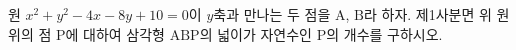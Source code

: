 원 $x^2 + y^2 - 4x - 8y + 10 = 0$이 $y$축과 만나는 두 점을 $\mathrm{A}$, $\mathrm{B}$라 하자.
제1사분면 위 원 위의 점 $\mathrm{P}$에 대하여 삼각형 $\mathrm{ABP}$의 넓이가 자연수인 $\mathrm{P}$의 개수를 구하시오.
